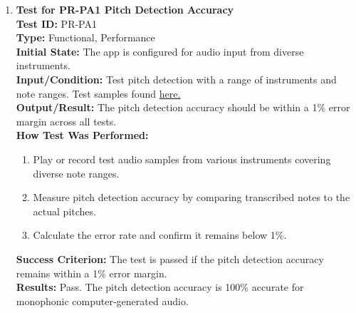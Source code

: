 \documentclass[12pt, titlepage]{article}
\begin{document}
\begin{enumerate}
    \item \textbf{Test for PR-PA1 Pitch Detection Accuracy} \\
      \newline
      \textbf{Test ID:} PR-PA1 \\
      \textbf{Type:} Functional, Performance \\
      \textbf{Initial State:} The app is configured for audio input from diverse instruments. \\
      \textbf{Input/Condition:} Test pitch detection with a range of instruments and note ranges. Test samples found 
      \href{https://github.com/emilyperica/ScoreGen/tree/main/test/TestingDatasets}{here.}\\
      \textbf{Output/Result:} The pitch detection accuracy should be within a 1\% error margin across all tests. \\
      \textbf{How Test Was Performed:}
      \begin{enumerate}
          \item Play or record test audio samples from various instruments covering diverse note ranges.
          \item Measure pitch detection accuracy by comparing transcribed notes to the actual pitches.
          \item Calculate the error rate and confirm it remains below 1\%.
      \end{enumerate}
      \textbf{Success Criterion:} The test is passed if the pitch detection accuracy remains within a 1\% error margin.\\
      \textbf{Results:} Pass. The pitch detection accuracy is 100\% accurate for monophonic computer-generated audio.\\


\end{enumerate}
\end{document}
